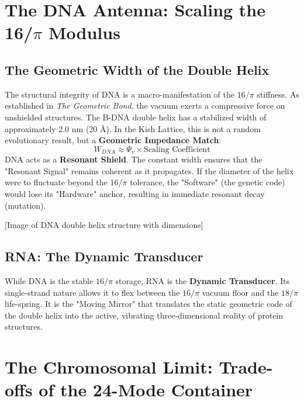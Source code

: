 \documentclass[11pt, letterpaper, openany]{book}
\begin{document}
\chapter{The DNA Antenna: Scaling the 16/$\pi$ Modulus}

\section{The Geometric Width of the Double Helix}
The structural integrity of DNA is a macro-manifestation of the $16/\pi$ stiffness. As established in \textit{The Geometric Bond}, the vacuum exerts a compressive force on unshielded structures. The B-DNA double helix has a stabilized width of approximately 2.0 nm (20 \r{A}). In the Kish Lattice, this is not a random evolutionary result, but a \textbf{Geometric Impedance Match}:
\begin{equation}
W_{DNA} \approx \Psi_{v} \times \text{Scaling Coefficient}
\end{equation}
DNA acts as a \textbf{Resonant Shield}. The constant width ensures that the "Resonant Signal" remains coherent as it propagates. If the diameter of the helix were to fluctuate beyond the $16/\pi$ tolerance, the "Software" (the genetic code) would lose its "Hardware" anchor, resulting in immediate resonant decay (mutation).



[Image of DNA double helix structure with dimensions]


\section{RNA: The Dynamic Transducer}
While DNA is the stable $16/\pi$ storage, RNA is the \textbf{Dynamic Transducer}. Its single-strand nature allows it to flex between the $16/\pi$ vacuum floor and the $18/\pi$ life-spring. It is the "Moving Mirror" that translates the static geometric code of the double helix into the active, vibrating three-dimensional reality of protein structures.

\chapter{The Chromosomal Limit: Trade-offs of the 24-Mode Container}
\end{document}
